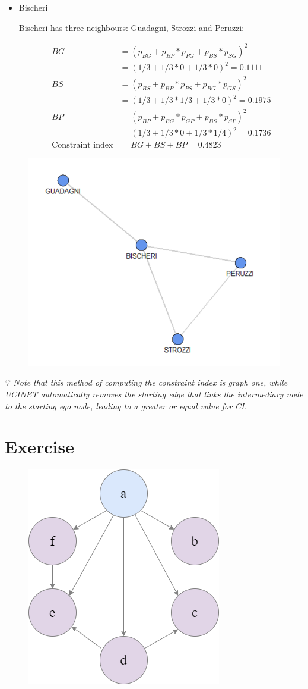 \documentclass[
  notitlepage,
  onecolumn,
  openany]{book}
\begin{document}
\begin{itemize}
\item
  Bischeri

  Bischeri has three neighbours: Guadagni, Strozzi and Peruzzi:

  \[
    \begin{aligned}
    BG &= (p_{BG}+p_{BP}*p_{PG}+p_{BS}*p_{SG})^2\\
    &=(1/3+1/3*0+1/3*0)^2 = 0.1111\\
    BS &= (p_{BS}+p_{BP}*p_{PS}+p_{BG}*p_{GS})^2\\
    &= (1/3+1/3*1/3+1/3*0)^2 = 0.1975\\
    BP &= (p_{BP}+p_{BG}*p_{GP}+p_{BS}*p_{SP})^2 \\&= (1/3+1/3*0+1/3*1/4)^2 = 0.1736\\
    \text{Constraint index} &= BG+BS+BP = 0.4823
    \end{aligned}
    \]
\end{itemize}

\begin{figure}[h!]

{\centering \includegraphics[width=0.3\linewidth]{images/08-Metrics for structural holes/Untitled 6} 

}

\end{figure}

💡 \emph{Note that this method of computing the constraint index is graph one, while UCINET automatically removes the starting edge that links the intermediary node to the starting ego node, leading to a greater or equal value for CI.}

\hypertarget{exercise}{%
\section{Exercise}\label{exercise}}

\begin{figure}[h!]

{\centering \includegraphics[width=0.35\linewidth]{images/08-Metrics for structural holes/08-constraint_index_example} 

}

\end{figure}
\end{document}

